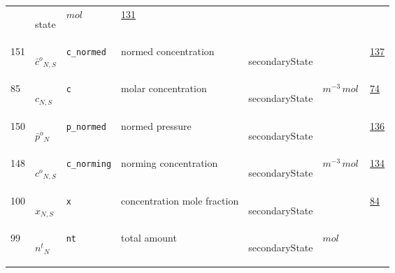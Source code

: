 \begin{longtable}{|p{1cm}|p{2.5cm}|p{4.5cm}|p{8cm}|p{3.0cm}|p{3cm}|p{1cm}|}
             & \begin{lay}state \end{lay}
             & $ mol \, $
             &                 \hyperlink{"e:131"}{ 131 }
                 \\
            151
             & \hypertarget{"v:151"}{ $ {{\bar{c}^o}}{_{N, S}} $}
             & \verb|c_normed|
             & normed concentration
             & \begin{lay}secondaryState \end{lay}
             & $  $
             &                 \hyperlink{"e:137"}{ 137 }
                 \\
            85
             & \hypertarget{"v:85"}{ $ {c}{_{N, S}} $}
             & \verb|c|
             & molar concentration
             & \begin{lay}secondaryState \end{lay}
             & $ m^{-3} \,mol \, $
             &                 \hyperlink{"e:74"}{ 74 }
                 \\
            150
             & \hypertarget{"v:150"}{ $ {{\bar{p}^o}}{_{N}} $}
             & \verb|p_normed|
             & normed pressure
             & \begin{lay}secondaryState \end{lay}
             & $  $
             &                 \hyperlink{"e:136"}{ 136 }
                 \\
            148
             & \hypertarget{"v:148"}{ $ {{c^o}}{_{N, S}} $}
             & \verb|c_norming|
             & norming concentration
             & \begin{lay}secondaryState \end{lay}
             & $ m^{-3} \,mol \, $
             &                 \hyperlink{"e:134"}{ 134 }
                 \\
            100
             & \hypertarget{"v:100"}{ $ {x}{_{N, S}} $}
             & \verb|x|
             & concentration mole fraction
             & \begin{lay}secondaryState \end{lay}
             & $  $
             &                 \hyperlink{"e:84"}{ 84 }
                 \\
            99
             & \hypertarget{"v:99"}{ $ {{n^t}}{_{N}} $}
             & \verb|nt|
             & total amount
             & \begin{lay}secondaryState \end{lay}
             & $ mol \, $

\end{longtable}
